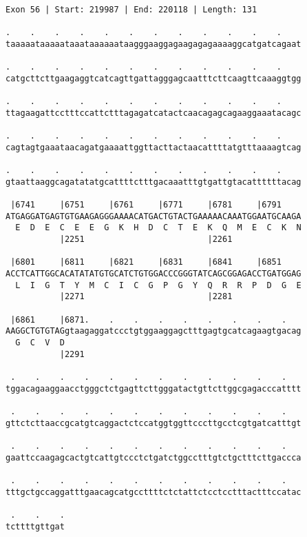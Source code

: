 \documentclass{article}
\begin{document}
\begin{Verbatim}[fontfamily=courier]
Exon 56 | Start: 219987 | End: 220118 | Length: 131

.    .    .    .    .    .    .    .    .    .    .    .    
taaaaataaaaataaataaaaaataagggaaggagaagagagaaaaggcatgatcagaat

.    .    .    .    .    .    .    .    .    .    .    .    
catgcttcttgaagaggtcatcagttgattagggagcaatttcttcaagttcaaaggtgg

.    .    .    .    .    .    .    .    .    .    .    .    
ttagaagattcctttccattctttagagatcatactcaacagagcagaaggaaatacagc

.    .    .    .    .    .    .    .    .    .    .    .    
cagtagtgaaataacagatgaaaattggttacttactaacattttatgtttaaaagtcag

.    .    .    .    .    .    .    .    .    .    .    .    
gtaattaaggcagatatatgcattttctttgacaaatttgtgattgtacattttttacag

 |6741     |6751     |6761     |6771     |6781     |6791    
ATGAGGATGAGTGTGAAGAGGGAAAACATGACTGTACTGAAAAACAAATGGAATGCAAGA
  E  D  E  C  E  E  G  K  H  D  C  T  E  K  Q  M  E  C  K  N
           |2251                         |2261              

 |6801     |6811     |6821     |6831     |6841     |6851    
ACCTCATTGGCACATATATGTGCATCTGTGGACCCGGGTATCAGCGGAGACCTGATGGAG
  L  I  G  T  Y  M  C  I  C  G  P  G  Y  Q  R  R  P  D  G  E
           |2271                         |2281              

 |6861     |6871.    .    .    .    .    .    .    .    .   
AAGGCTGTGTAGgtaagaggatccctgtggaaggagctttgagtgcatcagaagtgacag
  G  C  V  D                                                
           |2291                                            

 .    .    .    .    .    .    .    .    .    .    .    .   
tggacagaaggaacctgggctctgagttcttgggatactgttcttggcgagacccatttt

 .    .    .    .    .    .    .    .    .    .    .    .   
gttctcttaaccgcatgtcaggactctccatggtggttcccttgcctcgtgatcatttgt

 .    .    .    .    .    .    .    .    .    .    .    .   
gaattccaagagcactgtcattgtccctctgatctggcctttgtctgctttcttgaccca

 .    .    .    .    .    .    .    .    .    .    .    .   
tttgctgccaggatttgaacagcatgccttttctctattctcctcctttactttccatac

 .    .    .
tcttttgttgat
\end{Verbatim}
\newpage
\end{document}
